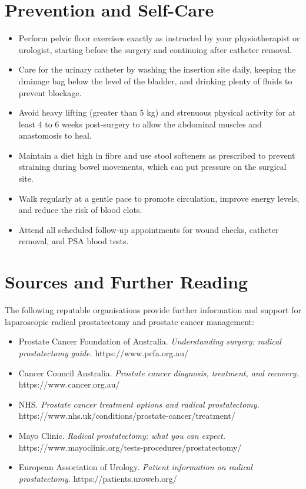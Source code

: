 \section*{Prevention and Self-Care}
\begin{itemize}
    \item Perform pelvic floor exercises exactly as instructed by your physiotherapist or urologist, starting before the surgery and continuing after catheter removal.
    \item Care for the urinary catheter by washing the insertion site daily, keeping the drainage bag below the level of the bladder, and drinking plenty of fluids to prevent blockage.
    \item Avoid heavy lifting (greater than 5 kg) and strenuous physical activity for at least 4 to 6 weeks post-surgery to allow the abdominal muscles and anastomosis to heal.
    \item Maintain a diet high in fibre and use stool softeners as prescribed to prevent straining during bowel movements, which can put pressure on the surgical site.
    \item Walk regularly at a gentle pace to promote circulation, improve energy levels, and reduce the risk of blood clots.
    \item Attend all scheduled follow-up appointments for wound checks, catheter removal, and PSA blood tests.
\end{itemize}

\section*{Sources and Further Reading}
The following reputable organisations provide further information and support for laparoscopic radical prostatectomy and prostate cancer management:
\begin{itemize}
    \item Prostate Cancer Foundation of Australia. \textit{Understanding surgery: radical prostatectomy guide.} https://www.pcfa.org.au/
    \item Cancer Council Australia. \textit{Prostate cancer diagnosis, treatment, and recovery.} https://www.cancer.org.au/
    \item NHS. \textit{Prostate cancer treatment options and radical prostatectomy.} https://www.nhs.uk/conditions/prostate-cancer/treatment/
    \item Mayo Clinic. \textit{Radical prostatectomy: what you can expect.} https://www.mayoclinic.org/tests-procedures/prostatectomy/
    \item European Association of Urology. \textit{Patient information on radical prostatectomy.} https://patients.uroweb.org/
\end{itemize}

